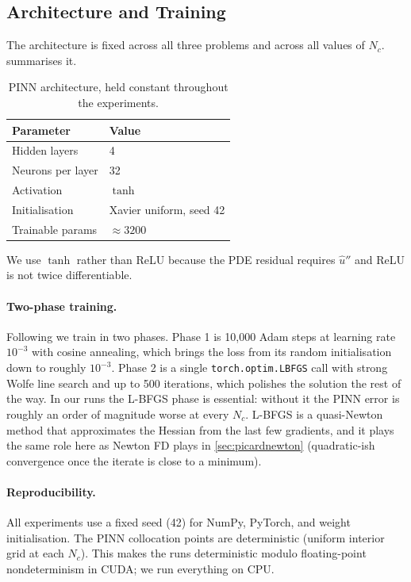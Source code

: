 \documentclass[11pt]{article}
\theoremstyle{plain}
\theoremstyle{remark}
\begin{document}
\subsection{Architecture and Training}
\label{sec:pinn_train}

The architecture is fixed across all three problems and across all
values of $N_c$.  summarises it.

\begin{table}[h]
\centering
\begin{tabular}{ll}
\toprule
\textbf{Parameter} & \textbf{Value} \\
\midrule
Hidden layers       & 4 \\
Neurons per layer   & 32 \\
Activation          & $\tanh$ \\
Initialisation      & Xavier uniform, seed 42 \\
Trainable params    & $\approx 3200$ \\
\bottomrule
\end{tabular}
\caption{PINN architecture, held constant throughout the experiments.}
\label{tab:pinn_arch}
\end{table}

We use $\tanh$ rather than ReLU because the PDE residual
requires $\hat{u}''$ and ReLU is not twice differentiable.

\paragraph{Two-phase training.} Following \citet{raissi2019} we train in
two phases.
Phase 1 is 10{,}000 Adam steps at learning rate $10^{-3}$ with cosine
annealing, which brings the loss from its random initialisation down to
roughly $10^{-3}$. Phase 2 is a single \texttt{torch.optim.LBFGS} call
with strong Wolfe line search and up to 500 iterations, which polishes
the solution the rest of the way. In our runs the L-BFGS phase is
essential: without it the PINN error is roughly an order of magnitude
worse at every $N_c$. L-BFGS is a quasi-Newton method that approximates
the Hessian from the last few gradients, and it plays the same role here
as Newton FD plays in \cref{sec:picardnewton} (quadratic-ish
convergence once the iterate is close to a minimum).

\paragraph{Reproducibility.} All experiments use a fixed seed (42) for
NumPy, PyTorch, and weight initialisation. The PINN collocation points
are deterministic (uniform interior grid at each $N_c$). This makes the
runs deterministic modulo floating-point nondeterminism in CUDA; we run
everything on CPU.
\end{document}
